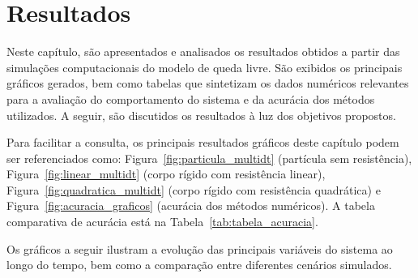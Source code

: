 
\chapter{Resultados}

Neste capítulo, são apresentados e analisados os resultados obtidos a partir das simulações computacionais do modelo de queda livre. São exibidos os principais gráficos gerados, bem como tabelas que sintetizam os dados numéricos relevantes para a avaliação do comportamento do sistema e da acurácia dos métodos utilizados. A seguir, são discutidos os resultados à luz dos objetivos propostos.

Para facilitar a consulta, os principais resultados gráficos deste capítulo podem ser referenciados como: Figura~\ref{fig:particula_multidt} (partícula sem resistência), Figura~\ref{fig:linear_multidt} (corpo rígido com resistência linear), Figura~\ref{fig:quadratica_multidt} (corpo rígido com resistência quadrática) e Figura~\ref{fig:acuracia_graficos} (acurácia dos métodos numéricos). A tabela comparativa de acurácia está na Tabela~\ref{tab:tabela_acuracia}.




Os gráficos a seguir ilustram a evolução das principais variáveis do sistema ao longo do tempo, bem como a comparação entre diferentes cenários simulados.

